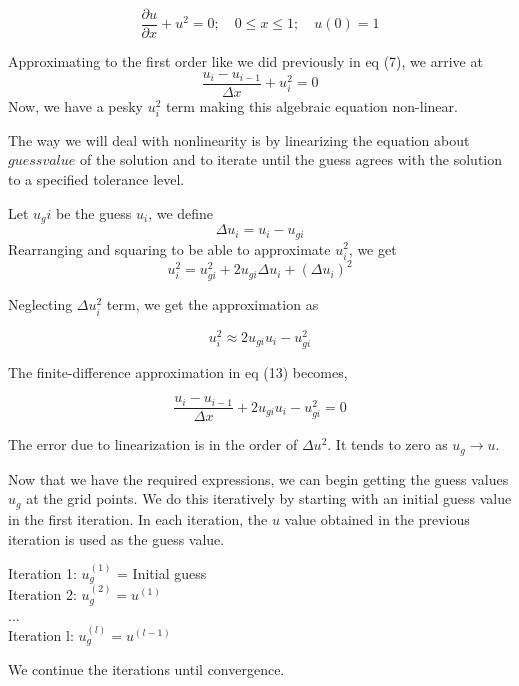 \documentclass[12pt]{article}
\begin{document}
\begin{equation}
    \frac{\partial u}{\partial x} + u^{2} = 0; \quad 0 \leq x \leq 1; \quad u(0) = 1
\end{equation}

Approximating to the first order like we did previously in eq (7), we arrive at 
\begin{equation}
    \frac{u_i -u_{i-1}}{\Delta x} + u^{2}_i = 0
\end{equation}
Now, we have a pesky $u^{2}_i $ term making this algebraic equation non-linear. 

The way we will deal with nonlinearity is by linearizing the equation about $guess value$ of the solution and to iterate until the guess agrees with the solution to a specified tolerance level. 

Let $u_gi$ be the guess $u_i$, we define
\begin{equation}
    \Delta u_i = u_i - u_{gi}
\end{equation}
Rearranging and squaring to be able to approximate $u_{i}^{2}$, we get
\begin{equation}
    u_{i}^{2} = u^{2}_{gi} +2u_{gi}\Delta u_{i} + (\Delta u_{i})^{2}
\end{equation}

Neglecting $\Delta u_{i}^{2}$ term, we get the approximation as

\begin{equation*}
    u_{i}^{2} \approx 2u_{gi} u_{i} - u^{2}_{gi}
\end{equation*}

The finite-difference approximation in eq (13) becomes,

\begin{equation}
    \frac{u_{i} - u_{i-1}}{\Delta x} + 2u_{gi}u_{i} - u^{2}_{gi} = 0
\end{equation}

The error due to linearization is in the order of $\Delta u^{2}$. It tends to zero as $u_{g} \xrightarrow{} u$.

Now that we have the required expressions, we can begin getting the guess values $u_g$ at the grid points. We do this iteratively by starting with an initial guess value in the first iteration. In each iteration, the $u$ value obtained in the previous iteration is used as the guess value. 
\\
\begin{center}
    

Iteration 1: $u^{(1)}_{g}$ = Initial guess \\
Iteration 2: $u_{g}^{(2)} = u^{(1)}$ \\
$\dotsc$ \\
Iteration l: $u^{(l)}_g  = u^{(l-1)}$ \\
\end{center}
We continue the iterations until convergence.
\end{document}
